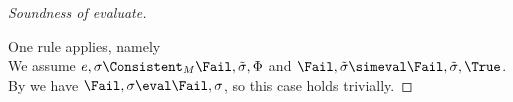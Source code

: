 \begin{proof}[Soundness of evaluate]
{    }

    {  One rule applies, namely \\
    We assume $e,\sigma\Consistent_M\Fail,\tilde{\sigma},\Phi$ and $\Fail,\tilde{\sigma}\simeval\Fail,\tilde{\sigma},\True$.
    By  we have $\Fail,\sigma\eval \Fail,\sigma$, so this case holds trivially.

    }

\end{proof}
